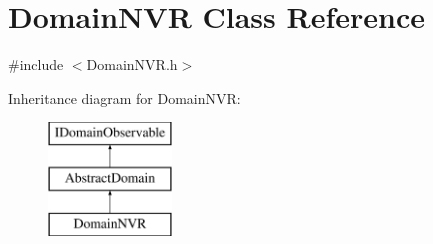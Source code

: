 \hypertarget{class_domain_n_v_r}{}\section{Domain\+N\+VR Class Reference}
\label{class_domain_n_v_r}


{\ttfamily \#include $<$Domain\+N\+V\+R.\+h$>$}

Inheritance diagram for Domain\+N\+VR\+:\begin{figure}[H]
\begin{center}
\leavevmode
\includegraphics[height=3.000000cm]{d0/d25/class_domain_n_v_r}
\end{center}
\end{figure}
